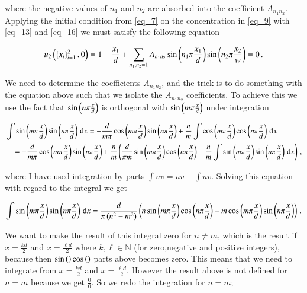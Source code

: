 \documentclass[11pt,english,a4paper]{article}
\begin{document}
\begin{flushleft}
where the negative values of $n_1$ and $n_2$ are absorbed into the coefficient $A_{n_1 n_2}$. Applying the initial condition from \eqref{eq_7} on the concentration in \eqref{eq_9} with \eqref{eq_13} and \eqref{eq_16} we must satisfy the following equation

\begin{align}
u_2\left({\left\lbrace{x_i}\right\rbrace_{i=1}^2,0}\right) = 1-\frac{x_1}{d}+ \sum_{n_1,n_2=1} A_{n_1 n_2} \sin\left({n_1\pi \frac{x_1}{d}}\right) \sin\left({n_2\pi \frac{x_2}{w}}\right)= 0 \,.
\label{eq_17}
\end{align}

We need to determine the coefficients $A_{n_1 n_2}$, and the trick is to do something with the equation above such that we isolate the $A_{n_1 n_2}$ coefficients. To achieve this we use the fact that $\sin\left({n\pi\frac{x}{d}}\right)$ is orthogonal with $\sin\left({m\pi\frac{x}{d}}\right)$ under integration 

\begin{align*}
&\int \sin\left({m\pi\frac{x}{d}}\right)\sin\left({n\pi\frac{x}{d}}\right)\,\mathrm{d}x = -\frac{d}{m\pi}\cos\left({m\pi\frac{x}{d}}\right)\sin\left({n\pi\frac{x}{d}}\right) + \frac{n}{m}\int \cos\left({m\pi\frac{x}{d}}\right)\cos\left({n\pi\frac{x}{d}}\right)\,\mathrm{d}x
\\
&\quad = -\frac{d}{m\pi}\cos\left({m\pi\frac{x}{d}}\right)\sin\left({n\pi\frac{x}{d}}\right) + \frac{n}{m}\left({\frac{d}{\pi m} \sin\left({m\pi\frac{x}{d}}\right) \cos\left({n\pi\frac{x}{d}}\right) + \frac{n}{m}\int \sin\left({m\pi\frac{x}{d}}\right)\sin\left({n\pi\frac{x}{d}}\right)\,\mathrm{d}x}\right) \,,
\end{align*}

where I have used integration by parts $\int u\dot{v} = uv - \int \dot{u}v$. Solving this equation with regard to the integral we get

\begin{align*}
\int \sin\left({m\pi\frac{x}{d}}\right)\sin\left({n\pi\frac{x}{d}}\right)\,\mathrm{d}x = \frac{d}{\pi\left({n^2 - m^2}\right)} \left({n \sin\left({m\pi\frac{x}{d}}\right)\cos\left({n\pi\frac{x}{d}}\right) - m \cos\left({m\pi\frac{x}{d}}\right)\sin\left({n\pi\frac{x}{d}}\right)}\right) \,.
\end{align*}

We want to make the result of this integral zero for $n\neq m$, which is the result if $x=\frac{k d}{2}$ and $x=\frac{\ell d}{2}$ where $k,\ell\in\mathbb{N}$ (for zero,negative and positive integers), because then $\sin \left({}\right)\cos \left({}\right)$ parts above becomes zero. This means that we need to integrate from $x=\frac{k d}{2}$ and $x=\frac{\ell d}{2}$. However the result above is not defined for $n=m$ because we get $\frac{0}{0}$. So we redo the integration for $n=m$;


\end{flushleft}
\end{document}
